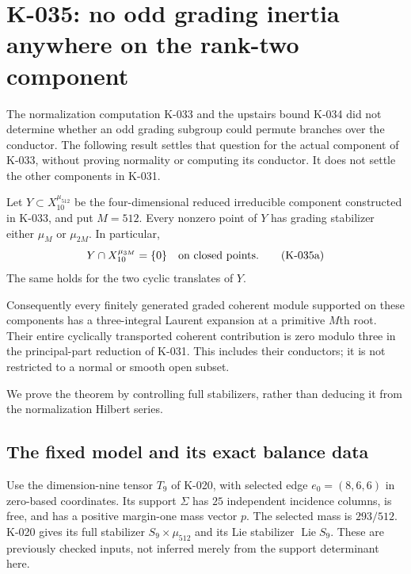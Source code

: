 \section{K-035: no odd grading inertia anywhere on the rank-two component}

The normalization computation K-033 and the upstairs bound K-034 did
not determine whether an odd grading subgroup could permute branches
over the conductor.  The following result settles that question for
the actual component of K-033, without proving normality or computing
its conductor.  It does not settle the other components in K-031.

\begin{theorem}[K-035]
Let $Y\subset X_{10}^{\mu_{512}}$ be the four-dimensional reduced
irreducible component constructed in K-033, and put $M=512$.
Every nonzero point of $Y$ has grading stabilizer either $\mu_M$
or $\mu_{2M}$.  In particular,
\[
                     Y\cap X_{10}^{\mu_{3M}}=\{0\}
                       \quad\hbox{on closed points}.    \tag{K-035a}
\]
The same holds for the two cyclic translates of $Y$.

Consequently every finitely generated graded coherent module supported
on these components has a three-integral Laurent expansion at a
primitive $M$th root.  Their entire cyclically transported coherent
contribution is zero modulo three in the principal-part reduction of
K-031.  This includes their conductors; it is not restricted to a
normal or smooth open subset.
\end{theorem}

We prove the theorem by controlling full stabilizers, rather than
deducing it from the normalization Hilbert series.

\subsection*{The fixed model and its exact balance data}

Use the dimension-nine tensor $T_9$ of K-020, with selected edge
$e_0=(8,6,6)$ in zero-based coordinates.  Its support $\Sigma$ has
$25$ independent incidence columns, is free, and has a positive
margin-one mass vector $p$.  The selected mass is $293/512$.
K-020 gives its full stabilizer $S_9\times\mu_{512}$ and its Lie
stabilizer $\operatorname{Lie}S_9$.  These are previously checked
inputs, not inferred merely from the support determinant here.

